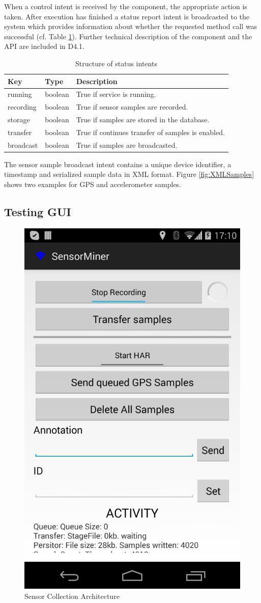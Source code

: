 When a control intent is received by the component, the appropriate
action is taken. After execution has finished a status report intent
is broadcasted to the system which provides information about whether
the requested method call was successful (cf. Table
\ref{tab:StatusIntent}).  Further technical description of the
component and the API are included in D4.1.

\begin{table}[ht]
\centering
\begin{tabular}{|l|l|l|} \hline
   Key       & Type    & Description                                       \\ \hline
   running   & boolean & True if service is running.                       \\
   recording & boolean & True if sensor samples are recorded.              \\
   storage   & boolean & True if samples are stored in the database.       \\
   transfer  & boolean & True if continues transfer of samples is enabled. \\
   broadcast & boolean & True if samples are broadcasted.                  \\ \hline
\end{tabular}
\caption{Structure of status intents}
\label{tab:StatusIntent}
\end{table}

The sensor sample broadcast intent contains a unique device
identifier, a timestamp and serialized sample data in XML
format. Figure \ref{fig:XMLSamples} shows two examples for GPS and
accelerometer samples.

\subsection{Testing GUI}

\begin{figure}[htbp]
\centering
\includegraphics[width=0.3 \textwidth]{img/sc/sc_gui.png}
\caption{Sensor Collection Architecture}\label{fig:sc_gui}
\end{figure}

